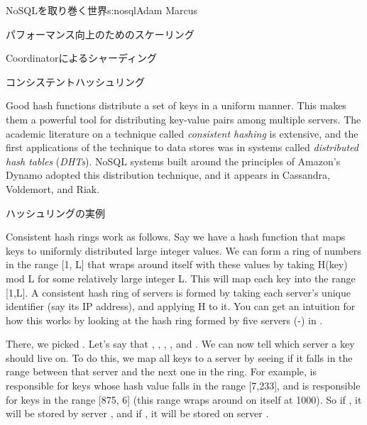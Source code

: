 \begin{aosachapter}{NoSQLを取り巻く世界}{s:nosql}{Adam Marcus}
\begin{aosasect1}{パフォーマンス向上のためのスケーリング}
\begin{aosasect2}{Coordinatorによるシャーディング}
\end{aosasect2}

\begin{aosasect2}{コンシステントハッシュリング}

Good hash functions distribute a set of keys in a uniform manner.
This makes them a powerful tool for distributing key-value pairs
among multiple servers.  The academic literature on a technique
called \emph{consistent hashing} is extensive, and the first
applications of the technique to data stores was in systems called
\emph{distributed hash tables} (\emph{DHTs}).  NoSQL systems built
around the principles of Amazon's Dynamo adopted this distribution
technique, and it appears in Cassandra, Voldemort, and Riak.

\begin{aosasect3}{ハッシュリングの実例}


Consistent hash rings work as follows.  Say we have a hash function
 that maps keys to uniformly distributed large integer values.  We
can form a ring of numbers in the range [1, L] that wraps around
itself with these values by taking H(key) mod L for some relatively
large integer L\@.  This will map each key into the range [1,L].  A
consistent hash ring of servers is formed by taking each server's
unique identifier (say its IP address), and applying H to it.  You can
get an intuition for how this works by looking at the hash ring formed
by five servers (-) in .

There, we picked .  Let's say that , , , , and .  We can now tell which
server a key should live on.  To do this, we map all keys to a server
by seeing if it falls in the range between that server and the next
one in the ring.  For example,  is responsible for keys whose
hash value falls in the range [7,233], and  is responsible for
keys in the range [875, 6] (this range wraps around on itself at
1000).  So if , it will be stored by
server , and if , it will be
stored on server .


\end{aosasect3}
\end{aosasect2}
\end{aosasect1}
\end{aosachapter}
